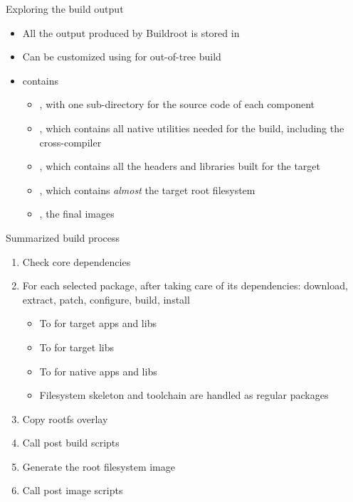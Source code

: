 \documentclass[aspectratio=169,obeyspaces,spaces,hyphens,dvipsnames]{beamer}
\begin{document}
\begin{frame}{Exploring the build output}
  \begin{itemize}
  \item All the output produced by Buildroot is stored in
  \item Can be customized using  for out-of-tree build
  \item {} contains
    \begin{itemize}
    \item {}, with one sub-directory for the source
      code of each component
    \item {}, which contains all native utilities
      needed for the build, including the cross-compiler
    \item {}, which contains all
      the headers and libraries built for the target
    \item {}, which contains {\em almost} the target
      root filesystem
    \item {}, the final images
    \end{itemize}
  \end{itemize}
\end{frame}

\begin{frame}{Summarized build process}
  \begin{enumerate}
  \item Check core dependencies
  \item For each selected package, after taking care of its
    dependencies: download, extract, patch, configure, build, install
    \begin{itemize}
    \item To  for target apps and libs
    \item To  for target libs
    \item To  for native apps and libs
    \item Filesystem skeleton and toolchain are handled as regular
      packages
    \end{itemize}
  \item Copy rootfs overlay
  \item Call post build scripts
  \item Generate the root filesystem image
  \item Call post image scripts
  \end{enumerate}
\end{frame}
\end{document}
